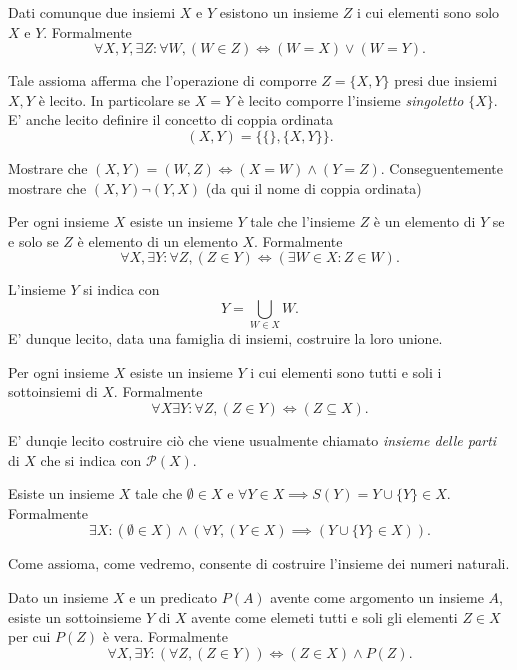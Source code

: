 \documentclass[12pt, twoside, italian, openany]{book}
\begin{document}
    \begin{axiom}
        Dati comunque due insiemi $X$ e $Y$ esistono un insieme $Z$ i cui elementi sono solo $X$ e $Y$. Formalmente
        $$
        \forall X, Y, \exists Z : \forall W, (W \in Z) \iff (W = X) \vee (W = Y).
        $$
    \end{axiom}
    Tale assioma afferma che l'operazione di comporre $Z = \{ X, Y \}$ presi due insiemi $X, Y$ è lecito. In particolare se $X = Y$ è lecito comporre l'insieme \emph{singoletto} $\{ X \}$. E' anche lecito definire il concetto di coppia ordinata
    $$
    (X, Y) = \{ \{ \}, \{ X, Y\} \}.
    $$
    \begin{exercise}
        Mostrare che $(X, Y) = (W, Z) \iff (X = W) \wedge (Y = Z)$. Conseguentemente mostrare che $(X, Y) \lnot (Y, X)$ (da qui il nome di coppia ordinata)
    \end{exercise}
    \begin{axiom}
        Per ogni insieme $X$ esiste un insieme $Y$ tale che l'insieme $Z$ è un elemento di $Y$ se e solo se $Z$ è elemento di un elemento $X$. Formalmente
        $$
        \forall X, \exists Y : \forall Z, (Z \in Y) \iff (\exists W \in X : Z \in W).
        $$
    \end{axiom}
    L'insieme $Y$ si indica con
    $$
    Y = \bigcup_{W \in X} W.
    $$
    E' dunque lecito, data una famiglia di insiemi, costruire la loro unione.
    \begin{axiom}
        Per ogni insieme $X$ esiste un insieme $Y$ i cui elementi sono tutti e soli i sottoinsiemi di $X$. Formalmente
        $$
        \forall X \exists Y: \forall Z, (Z \in Y) \iff (Z \subseteq X).
        $$
    \end{axiom}
    E' dunqie lecito costruire ciò che viene usualmente chiamato \emph{insieme delle parti} di $X$ che si indica con $\mathcal{P}(X)$.
    \begin{axiom}
        Esiste un insieme $X$ tale che $\emptyset \in X$ e $\forall Y \in X \implies S(Y) = Y \cup \{ Y \} \in X$. Formalmente
        $$
        \exists X: (\emptyset \in X) \wedge (\forall Y, (Y \in X) \implies (Y \cup \{ Y \} \in X)).
        $$
    \end{axiom}
    Come assioma, come vedremo, consente di costruire l'insieme dei numeri naturali.
    \begin{axiom}[di separazione]
        Dato un insieme $X$ e un predicato $P(A)$ avente come argomento un insieme $A$, esiste un sottoinsieme $Y$ di $X$ avente come elemeti tutti e soli gli elementi $Z \in X$ per cui $P(Z)$ è vera. Formalmente
        $$
        \forall X, \exists Y: (\forall Z, (Z \in Y)) \iff (Z \in X) \wedge P(Z).
        $$
    \end{axiom}
\end{document}
